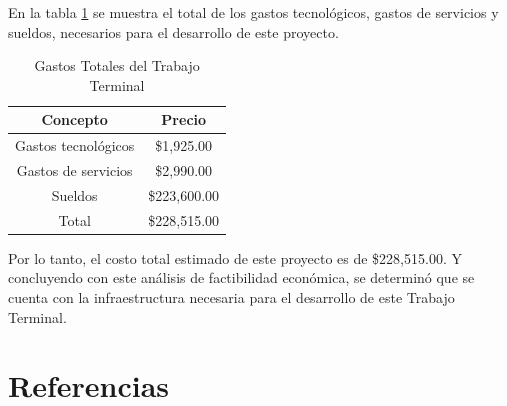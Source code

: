 En la tabla \ref{Gastostotales} se muestra el total de los gastos tecnológicos, gastos de servicios y sueldos, necesarios para el desarrollo de este proyecto.

\begin{table}[H]
	\centering
	\resizebox{10cm}{!} {
		\begin{tabular}{|c|c|}
			\hline
			Concepto & Precio \\ \hline
			Gastos tecnológicos & \$1,925.00 \\ \hline
			Gastos de servicios& \$2,990.00 \\ \hline
			Sueldos &  \$223,600.00 \\ \hline
			Total & \$228,515.00 \\ \hline
		\end{tabular}
	}
	\caption{Gastos Totales del Trabajo Terminal}
	\label{Gastostotales}
\end{table}

Por lo tanto, el costo total estimado de este proyecto es de \$228,515.00. Y concluyendo con este análisis de factibilidad económica, se determinó que se cuenta con la infraestructura necesaria para el desarrollo de este Trabajo Terminal.

 


\section{Referencias}

